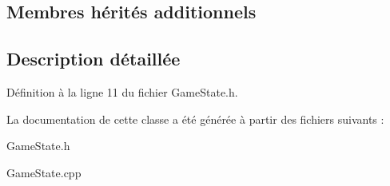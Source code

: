 \subsection*{Membres hérités additionnels}


\subsection{Description détaillée}


Définition à la ligne 11 du fichier Game\+State.\+h.



La documentation de cette classe a été générée à partir des fichiers suivants \+:\begin{DoxyCompactItemize}
\item 
Game\+State.\+h\item 
Game\+State.\+cpp\end{DoxyCompactItemize}
